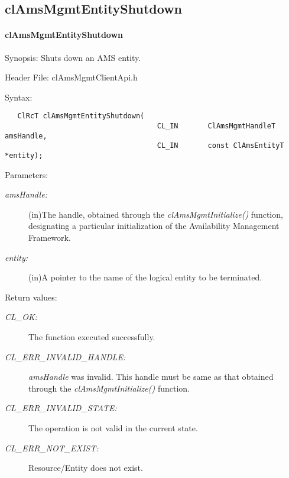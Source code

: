\subsection{clAmsMgmtEntityShutdown}
\hypertarget{pageams113}{}\paragraph{cl\-Ams\-Mgmt\-Entity\-Shutdown}\label{pageams113}
\begin{Desc}
\item[Synopsis:]Shuts down an AMS entity.\end{Desc}
\begin{Desc}
\item[Header File:]clAmsMgmtClientApi.h\end{Desc}
\begin{Desc}
\item[Syntax:]

\footnotesize\begin{verbatim}   ClRcT clAmsMgmtEntityShutdown(
                               		CL_IN       ClAmsMgmtHandleT            amsHandle,
                               		CL_IN       const ClAmsEntityT          *entity);
\end{verbatim}
\normalsize
\end{Desc}
\begin{Desc}
\item[Parameters:]
\begin{description}
\item[{\em ams\-Handle:}](in)The handle, obtained through the \textit{clAmsMgmtInitialize()} function, designating a particular initialization of the 
Availability Management Framework. \item[{\em entity:}](in)A pointer to the name of the logical entity to be terminated.\end{description}
\end{Desc}
\begin{Desc}
\item[Return values:]
\begin{description}
\item[{\em CL\_\-OK:}]The function executed successfully. \item[{\em CL\_\-ERR\_\-INVALID\_\-HANDLE:}]{\em ams\-Handle\/} was invalid. This handle must be same as that obtained through the \textit{clAmsMgmtInitialize()} function. \item[{\em CL\_\-ERR\_\-INVALID\_\-STATE:}]The operation is not valid in the current state. \item[{\em CL\_\-ERR\_\-NOT\_\-EXIST:}]Resource/Entity does not exist.\end{description}
\end{Desc}
